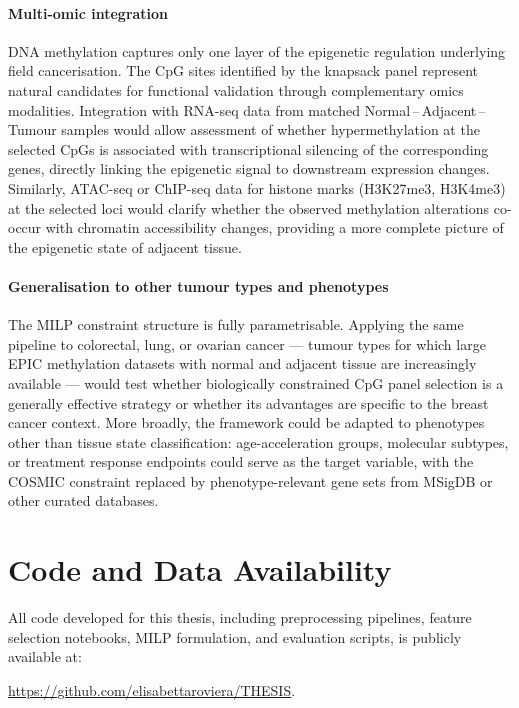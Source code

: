 \paragraph{Multi-omic integration}
DNA methylation captures only one layer of the epigenetic regulation
underlying field cancerisation.
The CpG sites identified by the knapsack panel represent natural candidates
for functional validation through complementary omics modalities.
Integration with RNA-seq data from matched Normal\,--\,Adjacent\,--\,Tumour
samples would allow assessment of whether hypermethylation at the selected
CpGs is associated with transcriptional silencing of the corresponding
genes, directly linking the epigenetic signal to downstream expression
changes.
Similarly, ATAC-seq or ChIP-seq data for histone marks (H3K27me3,
H3K4me3) at the selected loci would clarify whether the observed
methylation alterations co-occur with chromatin accessibility changes,
providing a more complete picture of the epigenetic state of adjacent
tissue.

\paragraph{Generalisation to other tumour types and phenotypes}
The MILP constraint structure is fully parametrisable.
Applying the same pipeline to colorectal, lung, or ovarian cancer ---
tumour types for which large EPIC methylation datasets with normal and
adjacent tissue are increasingly available --- would test whether
biologically constrained CpG panel selection is a generally effective
strategy or whether its advantages are specific to the breast cancer
context.
More broadly, the framework could be adapted to phenotypes other than
tissue state classification: age-acceleration groups, molecular subtypes,
or treatment response endpoints could serve as the target variable, with
the COSMIC constraint replaced by phenotype-relevant gene sets from MSigDB
or other curated databases.

\section{Code and Data Availability}
\label{sec:availability}

All code developed for this thesis, including preprocessing pipelines,
feature selection notebooks, MILP formulation, and evaluation scripts, is
publicly available at:
\begin{center}
    \url{https://github.com/elisabettaroviera/THESIS}.
\end{center}



